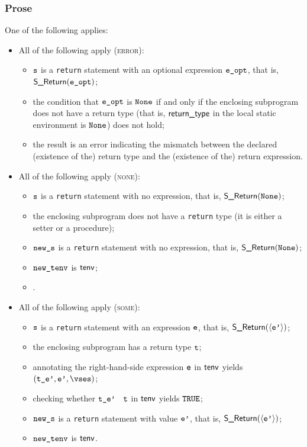 \subsubsection{Prose}
One of the following applies:
\begin{itemize}
  \item All of the following apply (\textsc{error}):
  \begin{itemize}
    \item $\texttt{s}$ is a \texttt{return} statement with an optional expression $\texttt{e\_opt}$, that is, \\
          $\textsf{S\_Return}(\texttt{e\_opt})$;
    \item the condition that $\texttt{e\_opt}$ is $\texttt{None}$ if and only if the enclosing subprogram does not have a return type
          (that is, $\textsf{return\_type}$ in the local static environment is $\texttt{None}$) does not hold;
    \item the result is an error indicating the mismatch between the declared (existence of the) return type
          and the (existence of the) return expression.
  \end{itemize}

  \item All of the following apply (\textsc{none}):
  \begin{itemize}
    \item $\texttt{s}$ is a \texttt{return} statement with no expression, that is, $\textsf{S\_Return}(\texttt{None})$;
    \item the enclosing subprogram does not have a \texttt{return} type (it is either a setter
          or a procedure);
    \item $\texttt{new\_s}$ is a \texttt{return} statement with no expression, that is, $\textsf{S\_Return}(\texttt{None})$;
    \item $\texttt{new\_tenv}$ is $\textsf{tenv}$;
    \item {}.
  \end{itemize}

  \item All of the following apply (\textsc{some}):
  \begin{itemize}
    \item $\texttt{s}$ is a \texttt{return} statement with an expression $\texttt{e}$, that is, $\textsf{S\_Return}(\langle \texttt{e'} \rangle)$;
    \item the enclosing subprogram has a return type $\texttt{t}$;
    \item annotating the right-hand-side expression $\texttt{e}$ in $\textsf{tenv}$ yields $(\tep,\vep,\vses)$\ProseOrTypeError;
    \item checking whether $\texttt{t\_e'}$ \typesatisfies\ $\texttt{t}$ in $\textsf{tenv}$ yields $\texttt{TRUE}$\ProseOrTypeError;
    \item $\texttt{new\_s}$ is a \texttt{return} statement with value $\texttt{e'}$, that is, $\textsf{S\_Return}(\langle \texttt{e'} \rangle)$;
    \item $\texttt{new\_tenv}$ is $\textsf{tenv}$.
  \end{itemize}
\end{itemize}

